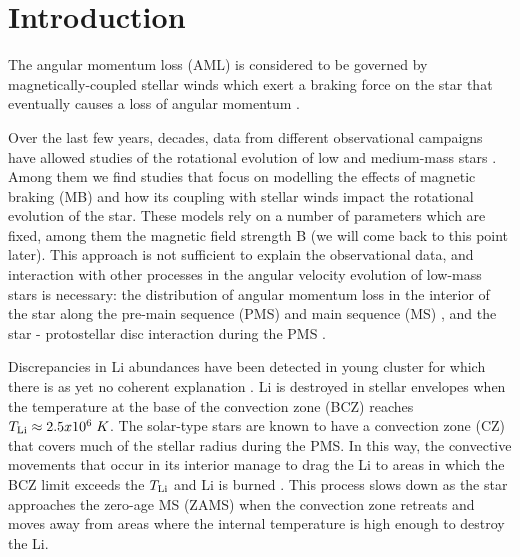 \documentclass[fleqn,usenatbib]{mnras}
\begin{document}


\section{Introduction} \label{sec_intro}
The angular momentum loss (AML) is considered to be governed by magnetically-coupled stellar winds which exert a braking force on the star that eventually causes a loss of angular momentum \citep{UdDoula2002}.

Over the last few years, decades, data from different observational campaigns have allowed studies of the rotational evolution of low and medium-mass stars \citep{Hartman2010,Gallet2013,Bouvier2016}. 
Among them we find studies \citep{Ud-Doula2008,Cranmer2011,Gallet2015,Amard2016} that focus on modelling the effects of magnetic braking (MB) and how its coupling with stellar winds impact the rotational evolution of the star. These models rely on a number of parameters which are fixed, among them the magnetic field strength B (we will come back to this point later). This approach is not sufficient to explain the observational data, and interaction with other processes in the angular velocity evolution of low-mass stars is necessary: the distribution of angular momentum loss in the interior of the star along the pre-main sequence (PMS) and main sequence (MS) \citep{Charbonnel2005, Eggenberger2008, Eggenberger2009, Navarro2020}, and the star - protostellar disc interaction during the PMS \citep{Bouvier2008,Gallet2013,Eggenberger2012,Zanni2012,Bouvier2016}.\par

Discrepancies in Li abundances have been detected in young cluster for which there is as yet no coherent explanation \citep[see][and references therein]{Navarro2020}. Li is destroyed in stellar envelopes when the temperature at the base of the convection zone (BCZ) reaches $T_{\mathrm{Li}} \approx 2.5 x 10^6\; K$. The solar-type stars are known to have a convection zone (CZ) that covers much of the stellar radius during the PMS. In this way, the convective movements that occur in its interior manage to drag the Li to areas in which the BCZ limit exceeds the $T_{\mathrm{Li}}$ and Li is burned \citep{Iben1965}. This process slows down as the star approaches the zero-age MS (ZAMS) when the convection zone retreats and moves away from areas where the internal temperature is high enough to destroy the Li.\par
\end{document}
